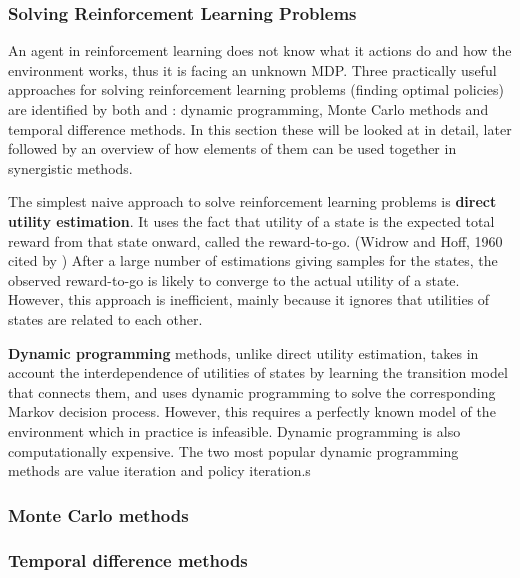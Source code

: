 \subsubsection{Solving Reinforcement Learning Problems}

An agent in reinforcement learning does not know what it actions do and how the
environment works, thus it is facing an unknown MDP. Three practically useful
approaches for solving reinforcement learning problems (finding optimal
policies) are identified by both \textcite{Russell210ai+modern} and
\textcite{Sutton1998ai+reinforcement}: dynamic programming, Monte Carlo methods
and temporal difference methods. In this section these will be looked at in
detail, later followed by an overview of how elements of them can be used
together in synergistic methods.

The simplest naive approach to solve reinforcement learning problems is
\textbf{direct utility estimation}. It uses the fact that utility of a state is
the expected total reward from that state onward, called the reward-to-go.
(Widrow and Hoff, 1960 cited by \textcite{Russell2010ai+modern}) After a large
number of estimations giving samples for the states, the observed reward-to-go
is likely to converge to the actual utility of a state. However, this approach
is inefficient, mainly because it ignores that utilities of states are related
to each other. \parencite{Russell2010ai+modern}

\textbf{Dynamic programming} methods, unlike direct utility estimation, takes
in account the interdependence of utilities of states by learning the
transition model that connects them, and uses dynamic programming to solve the
corresponding Markov decision process. However, this requires a perfectly known
model of the environment which in practice is infeasible. Dynamic programming
is also computationally expensive. The two most popular dynamic programming
methods are value iteration and policy iteration.s
\parencite{Sutton1998ai+reinforcement}

\subsubsection{Monte Carlo methods} 



\subsubsection{Temporal difference methods}


